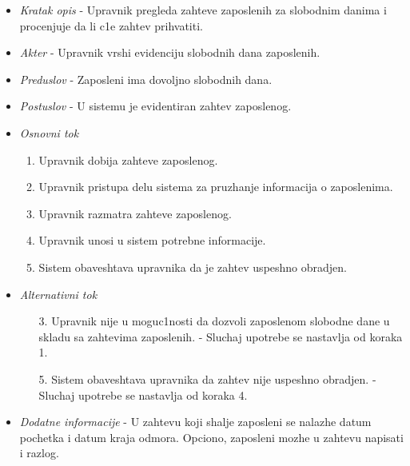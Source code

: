 \documentclass[10 pt]{article}
\begin{document}
		\begin{itemize}
			
			\item\textit{Kratak opis} - Upravnik pregleda zahteve zaposlenih za slobodnim danima i procenjuje da li c1e zahtev prihvatiti. 

				
			\item\textit{Akter} - Upravnik vrshi evidenciju slobodnih dana zaposlenih.

			
			\item\textit{Preduslov} - Zaposleni ima dovoljno slobodnih dana.

			
			\item\textit{Postuslov} - U sistemu je evidentiran zahtev zaposlenog.

			
			\item\textit{Osnovni tok}
				\begin{enumerate}
					\item Upravnik dobija zahteve zaposlenog. 

					\item Upravnik pristupa delu sistema za pruzhanje informacija o zaposlenima.

					\item Upravnik razmatra zahteve zaposlenog.

					\item Upravnik unosi u sistem potrebne informacije.

					\item Sistem obaveshtava upravnika da je zahtev uspeshno obradjen.

				\end{enumerate}
			
			\item\textit{Alternativni tok}
				\begin{enumerate}
					\item [3.] Upravnik nije u moguc1nosti da dozvoli zaposlenom slobodne dane u skladu sa zahtevima zaposlenih.
- Sluchaj upotrebe se nastavlja od koraka 1.

					\item [5.] Sistem obaveshtava upravnika da zahtev nije uspeshno obradjen. - Sluchaj upotrebe se nastavlja od koraka 4.
			
				\end{enumerate}
			
			\item\textit{Dodatne informacije} - U zahtevu koji shalje zaposleni se nalazhe datum pochetka i datum kraja odmora. Opciono, zaposleni mozhe u zahtevu napisati i razlog.

			
		\end{itemize}
		
\end{document}
